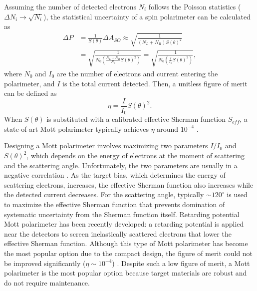 	Assuming the number of detected electrons $N_i$ follows the Poisson statistics ($\Delta N_i \rightarrow \sqrt{N_i}$), the statistical uncertainty of a spin polarimeter can be calculated as \cite{Jozwiak_thesis}
	\begin{equation}
	\begin{aligned}
			\Delta P & = \frac{1}{S(\theta)} \Delta A_{SO} \approx \sqrt{\frac{1}{(N_L + N_R)S(\theta)^2}}\\
			& = \sqrt{\frac{1}{N_0 (\frac{N_L + N_R}{N_0}S(\theta)^2)}} = \sqrt{\frac{1}{N_0 (\frac{I}{I_0}S(\theta)^2)}},
	\end{aligned}
	\end{equation}
	where $N_0$ and $I_0$ are the number of electrons and current entering the polarimeter, and $I$ is the total current detected. Then, a unitless figure of merit can be defined as 
	\begin{equation}
		\eta = \frac{I}{I_0} S(\theta)^2.
	\end{equation}
	When $S(\theta)$ is substituted with a calibrated effective Sherman function $S_{eff}$, a state-of-art Mott polarimeter typically achieves $\eta$ around $10^{-4}$ \cite{McCarter2010}.
	
	
	Designing a Mott polarimeter involves maximizing two parameters $I/I_0$ and $S(\theta)^2$, which depends on the energy of electrons at the moment of scattering and the scattering angle. Unfortunately, the two parameters are usually in a negative correlation \cite{McCarter2010}.
	As the target bias, which determines the energy of scattering electrons, increases, the effective Sherman function also increases while the detected current decreases. For the scattering angle, typically $\sim 120 ^{\circ}$ is used to maximize the effective Sherman function that prevents domination of systematic uncertainty from the Sherman function itself. Retarding potential Mott polarimeter has been recently developed: a retarding potential is applied near the detectors to screen inelastically scattered electrons that lower the effective Sherman function. Although this type of Mott polarimeter has become the most popular option due to the compact design, the figure of merit could not be improved significantly ($\eta \sim 10^{-4}$) \cite{Jozwiak_thesis}. Despite such a low figure of merit, a Mott polarimeter is the most popular option because target materials are robust and do not require maintenance.

